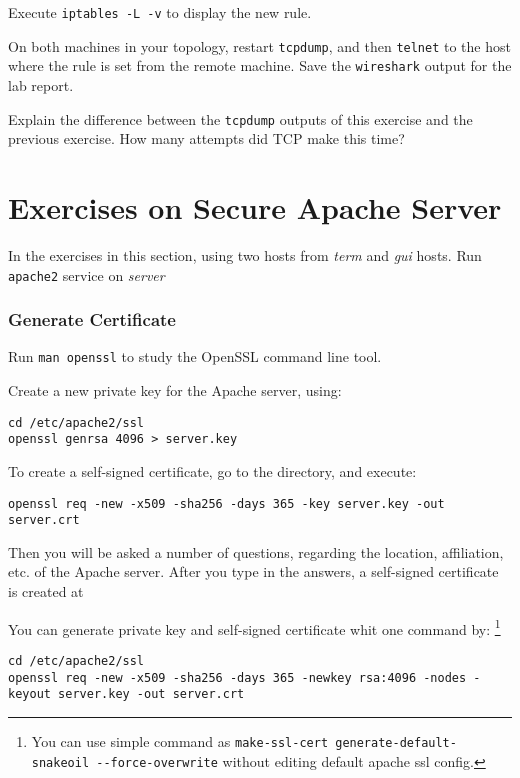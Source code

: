 \documentclass{../UTNetLab}
\begin{document}
    Execute \lstinline{iptables -L -v} to display the new rule.

    On both machines in your topology, restart \lstinline{tcpdump}, and then \lstinline{telnet} to the host where the rule is set from the remote machine.
    Save the \lstinline{wireshark} output for the lab report.
    
    \begin{report}
    \item Explain the difference between the \lstinline{tcpdump} outputs of this exercise and the previous exercise.
    How many attempts did {TCP} make this time?
    \end{report}

\part{Exercises on Secure Apache Server}
    In the exercises in this section, using two hosts from \textit{term} and \textit{gui} hosts.
    Run \lstinline{apache2} service on \textit{server}

\section{Generate Certificate}
    Run \lstinline{man openssl} to study the OpenSSL command line tool.

    Create a new private key for the Apache server, using:
    \begin{lstlisting}
cd /etc/apache2/ssl
openssl genrsa 4096 > server.key
    \end{lstlisting}
    To create a self-signed certificate, go to the  directory, and execute:
    \begin{lstlisting}
openssl req -new -x509 -sha256 -days 365 -key server.key -out server.crt
    \end{lstlisting}
    Then you will be asked a number of questions, regarding the location, affiliation, etc.
    of the Apache server.
    After you type in the answers, a self-signed certificate is created at 

    You can generate private key and self-signed certificate whit one command by:
    \footnote{You can use simple command as \lstinline{make-ssl-cert generate-default-snakeoil --force-overwrite} without editing default apache ssl config.}
    \begin{lstlisting}
cd /etc/apache2/ssl
openssl req -new -x509 -sha256 -days 365 -newkey rsa:4096 -nodes -keyout server.key -out server.crt
    \end{lstlisting}
\end{document}
